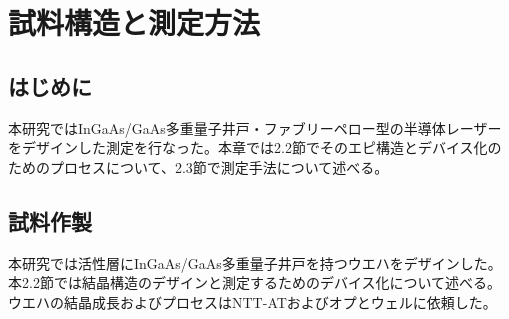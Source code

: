 
\chapter{試料構造と測定方法}%
\section{はじめに}%
本研究ではInGaAs/GaAs多重量子井戸・ファブリーペロー型の半導体レーザーをデザインした測定を行なった。本章では2.2節でそのエピ構造とデバイス化のためのプロセスについて、2.3節で測定手法について述べる。
\section{試料作製}%
本研究では活性層にInGaAs/GaAs多重量子井戸を持つウエハをデザインした。本2.2節では結晶構造のデザインと測定するためのデバイス化について述べる。ウエハの結晶成長およびプロセスはNTT-ATおよびオプとウェルに依頼した。

